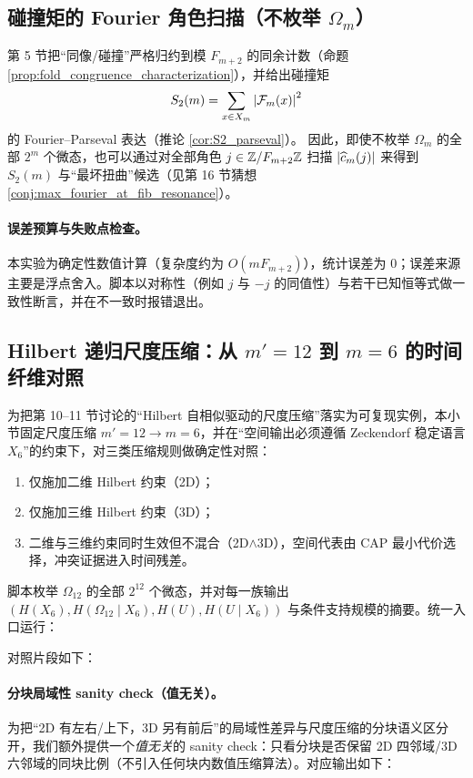 \subsection{碰撞矩的 Fourier 角色扫描（不枚举 \texorpdfstring{$\Omega_m$}{Omega m}）}
\MathTag
第 5 节把“同像/碰撞”严格归约到模 $F_{m+2}$ 的同余计数（命题 \ref{prop:fold_congruence_characterization}），并给出碰撞矩
$$
S_2(m)=\sum_{x\in X_m}\left\lvert \mathcal F_m(x)\right\rvert^2
$$
的 Fourier--Parseval 表达（推论 \ref{cor:S2_parseval}）。
因此，即使不枚举 $\Omega_m$ 的全部 $2^m$ 个微态，也可以通过对全部角色 $j\in\mathbb{Z}/F_{m+2}\mathbb{Z}$ 扫描 $\left\lvert \widehat c_m(j)\right\rvert$ 来得到 $S_2(m)$ 与“最坏扭曲”候选（见第 16 节猜想 \ref{conj:max_fourier_at_fib_resonance}）。


\paragraph{误差预算与失败点检查。}
\AuditTag 本实验为确定性数值计算（复杂度约为 $O(mF_{m+2})$），统计误差为 $0$；误差来源主要是浮点舍入。脚本以对称性（例如 $j$ 与 $-j$ 的同值性）与若干已知恒等式做一致性断言，并在不一致时报错退出。

\subsection{Hilbert 递归尺度压缩：从 $m'=12$ 到 $m=6$ 的时间纤维对照}
为把第 10--11 节讨论的“Hilbert 自相似驱动的尺度压缩”落实为可复现实例，本小节固定尺度压缩 $m'=12\to m=6$，并在“空间输出必须遵循 Zeckendorf 稳定语言 $X_6$”的约束下，对三类压缩规则做确定性对照：
\begin{enumerate}
  \item 仅施加二维 Hilbert 约束（2D）；
  \item 仅施加三维 Hilbert 约束（3D）；
  \item 二维与三维约束同时生效但不混合（2D$\wedge$3D），空间代表由 CAP 最小代价选择，冲突证据进入时间残差。
\end{enumerate}
脚本枚举 $\Omega_{12}$ 的全部 $2^{12}$ 个微态，并对每一族输出 $(H(X_6),H(\Omega_{12}\mid X_6),H(U),H(U\mid X_6))$ 与条件支持规模的摘要。统一入口运行：
\begin{center}
\end{center}
对照片段如下：


\paragraph{分块局域性 sanity check（值无关）。}
\AuditTag 为把“2D 有左右/上下，3D 另有前后”的局域性差异与尺度压缩的分块语义区分开，我们额外提供一个\emph{值无关}的 sanity check：只看分块是否保留 2D 四邻域/3D 六邻域的同块比例（不引入任何块内数值压缩算法）。对应输出如下：


